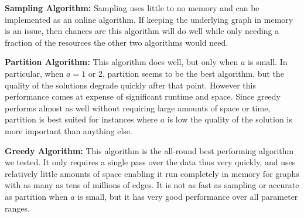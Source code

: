 \textbf{Sampling Algorithm:} Sampling uses little to no memory and can
be implemented as an online algorithm. If keeping the underlying graph in
memory is an issue, then chances are this algorithm will do well while only needing
a fraction of the resources the other two algorithms would need. \vs

\textbf{Partition Algorithm:} This algorithm does well, but only when $a$ is small.
In particular, when $a=1$ or 2, partition seems to be the best algorithm, but the quality
of the solutions degrade quickly after that point. However this performance comes at
expense of significant runtime and space. Since greedy performs almost as well without
requiring large amounts of space or time, partition is best suited for instances where
$a$ is low the quality of the solution is more important than anything else. \vs

\textbf{Greedy Algorithm:} This algorithm is the all-round best performing algorithm we tested.
It only requires a single pass over the data thus very quickly,  and uses
relatively little amounts of space enabling it run completely in memory for graphs with
as many as tens of millions of edges. It is not as fast as sampling or accurate as partition
when $a$ is small, but it has very good performance over all parameter ranges.
